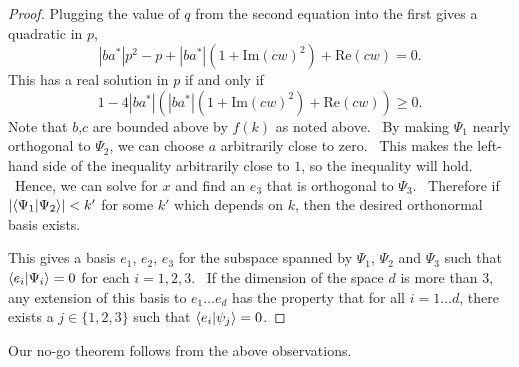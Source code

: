 \documentclass[letterpaper,11pt]{article}
\newcommand{\braket}[2]{\mbox{$ \langle #1 | #2 \rangle $}}
\begin{document}
\begin{proof}
\noindent Plugging the value of $q$ from the second equation into the first gives a quadratic in $p$,
\[
 |ba^*| p^2 - p + |ba^*| \left(1 + \mathrm{Im}(cw)^2\right) + \mathrm{Re}(cw) = 0.
\]
This has a real solution in $p$ if and only if
\[
1 - 4 |ba^*| \left(|ba^*|\left(1+ \mathrm{Im}(cw)^2\right) + \mathrm{Re}(cw)\right) \geq 0.
\]
Note that $b$,$c$ are bounded above by $f(k)$ as noted above. \ By making $\Psi_1$ nearly orthogonal to $\Psi_2$, we can choose $a$ arbitrarily close to zero. \ This makes the left-hand side of the inequality arbitrarily close to $1$, so the inequality will hold. \ Hence, we can solve for $x$ and find an $e_3$ that is orthogonal to $\Psi_3$. \ Therefore if $|\braket{\Psi_1}{\Psi_2}|<k'$ for some $k'$ which depends on $k$, then the desired orthonormal basis exists.

This gives a basis $e_1$, $e_2$, $e_3$ for the subspace spanned by $\Psi_1$, $\Psi_2$ and $\Psi_3$ such that $\braket{e_i}{\Psi_i}=0$ for each $i=1,2,3$. \ If the dimension of the space $d$ is more than $3$, any extension of this basis to $e_1 \ldots e_d$ has the property that for all $i=1\ldots d$, there exists a $j \in \{1,2,3\}$ such that $\braket{e_i}{\psi_j}=0$.

\end{proof}

Our no-go theorem follows from the above observations.
\end{document}
